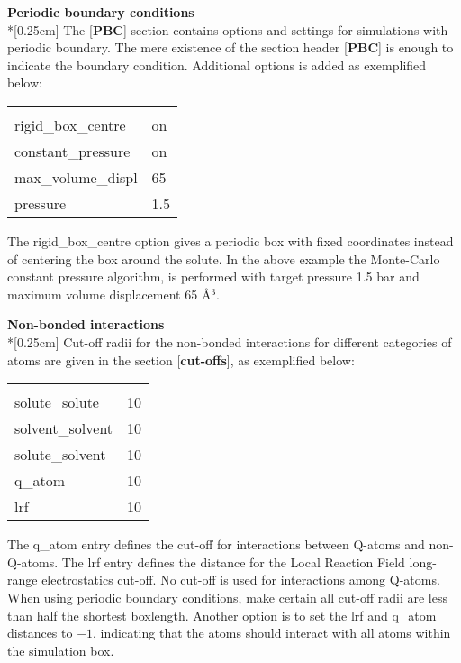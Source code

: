 \documentclass[a4paper,11pt]{article}
\begin{document}
\textbf{Periodic boundary conditions}\\*[0.25cm] The
[\textbf{PBC}] section contains options and settings for
simulations with periodic boundary. The mere existence of the
section header [\textbf{PBC}] is enough to indicate the boundary
condition. Additional options is added as exemplified below:

\begin{center}
\begin{tabularx}{\textwidth}{|l X|}
  \hline
  [PBC]                  & \\
  rigid{\_}box{\_}centre & on \\
  constant{\_}pressure   & on \\
  max{\_}volume{\_}displ & 65 \\
  pressure               & 1.5 \\ \hline
\end{tabularx}
\end{center}

The rigid{\_}box{\_}centre option gives a periodic box with fixed
coordinates instead of centering the box around the solute. In the
above example the Monte-Carlo constant pressure algorithm,
is performed with target
pressure 1.5 bar and maximum volume displacement 65 {\AA}$^{3}$.

\textbf{Non-bonded interactions} \\*[0.25cm] Cut-off radii for the
non-bonded interactions for different categories of atoms are
given in the section [\textbf{cut-offs}], as exemplified below:

\begin{center}
\begin{tabularx}{\textwidth}{|l X|}
  \hline
  [cut-offs]         & \\
  solute{\_}solute   & 10 \\
  solvent{\_}solvent & 10 \\
  solute{\_}solvent  & 10 \\
  q{\_}atom          & 10 \\ 
  lrf                & 10 \\ \hline
\end{tabularx}
\end{center}

The q{\_}atom entry defines the cut-off for interactions between
Q-atoms and non-Q-atoms. The lrf entry defines the distance for the 
Local Reaction Field long-range electrostatics cut-off. 
No cut-off is used for interactions among
Q-atoms. When using periodic boundary conditions, make certain all
cut-off radii are less than half the shortest boxlength. 
Another option is to set the lrf and q{\_}atom distances to $-1$,
indicating that the atoms should interact with all atoms within the simulation box.
\end{document}
